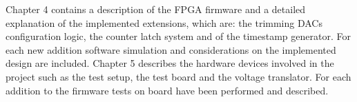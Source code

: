 \vspace{0.25cm}
\newline
Chapter 4 contains a description of the FPGA firmware and a detailed explanation of the implemented extensions, which are: the trimming DACs configuration logic, the counter latch system and of the timestamp generator.
For each new addition software simulation and considerations on the implemented design are included.
\vspace{0.25cm}
\newline
Chapter 5 describes the hardware devices involved in the project such as the test setup, the test board and the voltage translator.
For each addition to the firmware tests on board have been performed and described.

